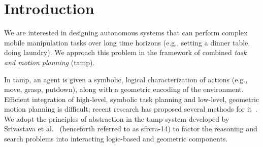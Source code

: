 \section{Introduction}
We are interested in designing autonomous systems that can perform
complex mobile manipulation tasks over long time horizons (e.g.,
setting a dinner table, doing laundry). We approach this problem in
the framework of combined \emph{task and motion planning} ({\sc tamp}).

In {\sc tamp}, an agent is
given a symbolic, logical characterization of actions (e.g., move,
grasp, putdown), along with a geometric encoding of the
environment.  Efficient integration of high-level, symbolic task planning
and low-level, geometric motion planning is
difficult; recent research has proposed several methods for
it~\cite{srivastava2014combined, deardenplanningtamp, kaelbling2011hierarchical,
  lagriffoul2014orientation, GarrettWAFR14, dornhege2012semantic}.
We adopt the principles of abstraction in the {\sc tamp} system developed by
Srivastava et al.~\cite{srivastava2014combined} (henceforth referred
to as {\sc sfrcra-14}) to factor the reasoning and search problems into
interacting logic-based and geometric components.

